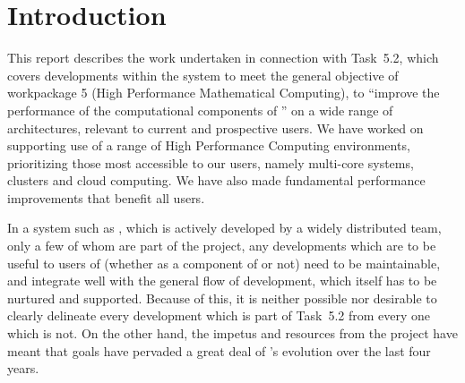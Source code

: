 \documentclass{deliverablereport}
\author{Author names}
\begin{document}
\maketitle
\githubissuedescription

\newpage
\tableofcontents






\section{Introduction}
This report describes the work undertaken in connection with Task~5.2,
which covers developments within the \GAP system to meet the general
objective of workpackage 5 (High Performance Mathematical
Computing), to ``improve the performance of the computational
components of \ODK'' on  a wide range of architectures,
relevant to current and prospective users. We have worked on
supporting use of a range of High Performance Computing environments,
prioritizing those most accessible to our users, namely multi-core
systems, clusters and cloud computing. We have also made
fundamental performance improvements that benefit all \GAP users.

In a system such as \GAP, which is actively developed by a widely
distributed team, only a few of whom are part of the \ODK project, any
developments which are to be useful to users of \GAP (whether as a component of
\ODK or not) need to be maintainable, and
integrate well with the general flow of \GAP development, which itself
has to be nurtured and supported. Because of this, it is neither
possible nor desirable to clearly delineate every development which
is part of Task~5.2 from every one which is not. On the other hand,
the impetus and resources from the \ODK project have meant that \ODK
goals have pervaded a great deal of \GAP's evolution over the last
four years.
\end{document}
